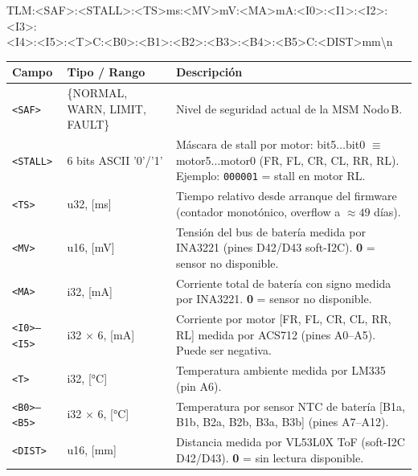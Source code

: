 \begin{center}
\small\ttfamily
TLM:<SAF>:<STALL>:<TS>ms:<MV>mV:<MA>mA:<I0>:<I1>:<I2>:<I3>:\\
\phantom{TLM:}<I4>:<I5>:<T>C:<B0>:<B1>:<B2>:<B3>:<B4>:<B5>C:<DIST>mm\textbackslash n
\end{center}

\begin{center}
\small
\renewcommand{\arraystretch}{1.3}
\begin{tabular}{p{1.8cm}p{3.0cm}p{7.5cm}}
\toprule
\textbf{Campo} & \textbf{Tipo / Rango} & \textbf{Descripción} \\
\midrule
\verb|<SAF>| &
  \{NORMAL, WARN, LIMIT, FAULT\} &
  Nivel de seguridad actual de la MSM Nodo\,B. \\

\verb|<STALL>| &
  6 bits ASCII '0'/'1' &
  Máscara de stall por motor: bit5$\ldots$bit0 $\equiv$ motor5$\ldots$motor0
  (FR, FL, CR, CL, RR, RL). Ejemplo: \verb|000001| = stall en motor RL. \\

\verb|<TS>| &
  u32, [ms] &
  Tiempo relativo desde arranque del firmware (contador monotónico, overflow a $\approx 49$ días). \\

\verb|<MV>| &
  u16, [mV] &
  Tensión del bus de batería medida por INA3221 (pines D42/D43 soft-I2C).
  \textbf{0} = sensor no disponible. \\

\verb|<MA>| &
  i32, [mA] &
  Corriente total de batería con signo medida por INA3221.
  \textbf{0} = sensor no disponible. \\

\verb|<I0>–<I5>| &
  i32 $\times$ 6, [mA] &
  Corriente por motor [FR, FL, CR, CL, RR, RL] medida por ACS712
  (pines A0–A5). Puede ser negativa. \\

\verb|<T>| &
  i32, [°C] &
  Temperatura ambiente medida por LM335 (pin A6). \\

\verb|<B0>–<B5>| &
  i32 $\times$ 6, [°C] &
  Temperatura por sensor NTC de batería [B1a, B1b, B2a, B2b, B3a, B3b]
  (pines A7–A12). \\

\verb|<DIST>| &
  u16, [mm] &
  Distancia medida por VL53L0X ToF (soft-I2C D42/D43).
  \textbf{0} = sin lectura disponible. \\
\bottomrule
\end{tabular}
\end{center}

